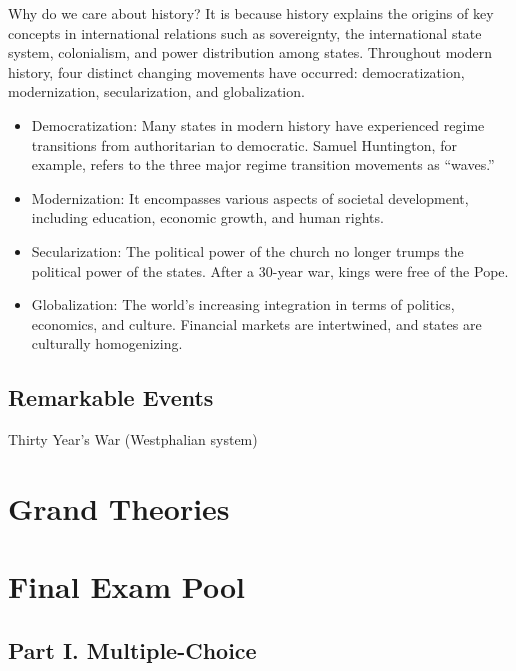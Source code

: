 \documentclass[
]{book}
\begin{document}
Why do we care about history? It is because history explains the origins of key concepts in international relations such as sovereignty, the international state system, colonialism, and power distribution among states. Throughout modern history, four distinct changing movements have occurred: democratization, modernization, secularization, and globalization.

\begin{itemize}
\item
  Democratization: Many states in modern history have experienced regime transitions from authoritarian to democratic. Samuel Huntington, for example, refers to the three major regime transition movements as ``waves.''
\item
  Modernization: It encompasses various aspects of societal development, including education, economic growth, and human rights.
\item
  Secularization: The political power of the church no longer trumps the political power of the states. After a 30-year war, kings were free of the Pope.
\item
  Globalization: The world's increasing integration in terms of politics, economics, and culture. Financial markets are intertwined, and states are culturally homogenizing.
\end{itemize}

\hypertarget{remarkable-events}{%
\section{Remarkable Events}\label{remarkable-events}}

Thirty Year's War (Westphalian system)

\hypertarget{grand-theories}{%
\chapter{Grand Theories}\label{grand-theories}}

\hypertarget{final-exam-pool}{%
\chapter*{Final Exam Pool}\label{final-exam-pool}}

\hypertarget{part-i.-multiple-choice}{%
\section*{Part I. Multiple-Choice}\label{part-i.-multiple-choice}}
\end{document}
